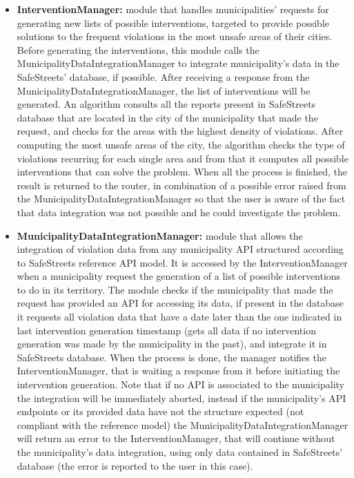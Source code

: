 \begin{itemize}
	\item \textbf{InterventionManager:}
	module that handles municipalities' requests for generating new lists of possible interventions, targeted to provide possible solutions to the frequent violations in the most unsafe areas of their cities. Before generating the interventions, this module calls the MunicipalityDataIntegrationManager to integrate municipality's data in the SafeStreets' database, if possible. After receiving a response from the MunicipalityDataIntegrationManager, the list of interventions will be generated. An algorithm consults all the reports present in SafeStreets database that are located in the city of the municipality that made the request, and checks for the areas with the highest density of violations. After computing the most unsafe areas of the city, the algorithm checks the type of violations recurring for each single area and from that it computes all possible interventions that can solve the problem. When all the process is finished, the result is returned to the router, in combination of a possible error raised from the MunicipalityDataIntegrationManager so that the user is aware of the fact that data integration was not possible and he could investigate the problem.
	\item \textbf{MunicipalityDataIntegrationManager:}
	module that allows the integration of violation data from any municipality API structured according to SafeStreets reference API model. It is accessed by the InterventionManager when a municipality request the generation of a list of possible interventions to do in its territory. The module checks if the municipality that made the request has provided an API for accessing its data, if present in the database it requests all violation data that have a date later than the one indicated in last intervention generation timestamp (gets all data if no intervention generation was made by the municipality in the past), and integrate it in SafeStreets database. When the process is done, the manager notifies the InterventionManager, that is waiting a response from it before initiating the intervention generation. Note that if no API is associated to the municipality the integration will be immediately aborted, instead if the municipality's API endpoints or its provided data have not the structure expected (not compliant with the reference model) the MunicipalityDataIntegrationManager will return an error to the InterventionManager, that will continue without the municipality's data integration, using only data contained in SafeStreets' database (the error is reported to the user in this case).
\end{itemize}